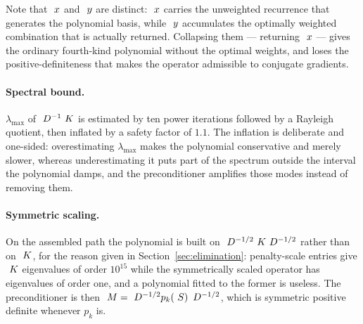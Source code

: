\noindent Note that $~x$ and $~y$ are distinct: $~x$ carries
the unweighted recurrence that generates the polynomial basis, while $~y$
accumulates the optimally weighted combination that is actually returned.
Collapsing them --- returning $~x$ --- gives the ordinary fourth-kind
polynomial without the optimal weights, and loses the positive-definiteness
that makes the operator admissible to conjugate gradients.

\paragraph{Spectral bound.}  $\lambda_{\max}$ of $~D^{-1}~K$ is estimated
by ten power iterations followed by a Rayleigh quotient, then inflated by a
safety factor of $1.1$.  The inflation is deliberate and one-sided:
overestimating $\lambda_{\max}$ makes the polynomial conservative and merely
slower, whereas underestimating it puts part of the spectrum outside the
interval the polynomial damps, and the preconditioner amplifies those modes
instead of removing them.

\paragraph{Symmetric scaling.}  On the assembled path the polynomial is built
on $~D^{-1/2}~K~D^{-1/2}$ rather than on $~K$, for the reason given
in Section~\ref{sec:elimination}: penalty-scale entries give $~K$
eigenvalues of order $10^{15}$ while the symmetrically scaled operator has
eigenvalues of order one, and a polynomial fitted to the former is useless.
The preconditioner is then $~M = ~D^{-1/2} p_k(~S)\, ~D^{-1/2}$,
which is symmetric positive definite whenever $p_k$ is.
